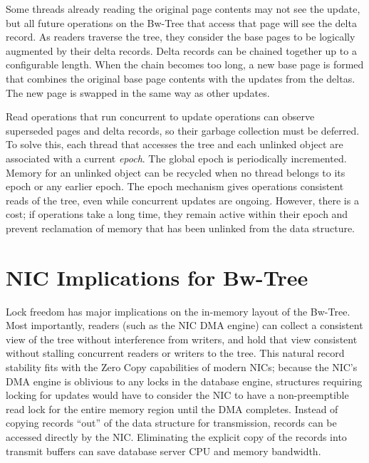 Some threads already reading the original page contents may not see
the update, but all future operations on the Bw-Tree that access that page
will see the delta record. As readers traverse the tree, they consider
the base pages to be logically augmented by their delta records. Delta records
can be chained together up to a configurable length.  When the chain becomes
too long, a new base page is formed that combines the original base page
contents with the updates from the deltas. The new page is swapped in
the same way as other updates.

Read operations that run concurrent to update operations can observe superseded
pages and delta records, so their garbage collection must be deferred.
To solve this, each thread that
accesses the tree and each unlinked object are associated with a current {\em epoch}.
The global epoch is periodically incremented. Memory for an unlinked object can be
recycled when no thread belongs to its epoch or any earlier epoch.
The epoch mechanism gives operations consistent reads of the
tree, even while concurrent updates are ongoing. However, there is a
cost; if operations take a long time, they remain active within their epoch and
prevent reclamation of memory that has been unlinked from the data structure.


\section{NIC Implications for Bw-Tree}
Lock freedom has major implications on the in-memory layout of the
Bw-Tree. Most importantly, readers (such as the NIC DMA engine) can collect a
consistent view of the tree without interference from writers, and hold that
view consistent without stalling concurrent readers or writers to the tree.  This
natural record stability fits with the Zero Copy capabilities of modern NICs;
because the NIC's DMA engine is oblivious to any locks in the database engine,
structures requiring locking for updates would have to consider the NIC to
have a non-preemptible read lock for the entire memory region until the DMA completes.
Instead of copying records ``out'' of the data structure for transmission,
records can be accessed directly by the NIC. Eliminating the explicit copy of
the records into transmit buffers can save database server CPU and memory
bandwidth.

